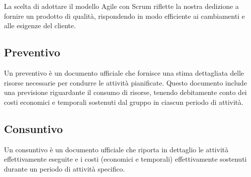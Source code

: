 \documentclass{article}
\begin{document}
La scelta di adottare il modello Agile con Scrum riflette la nostra dedizione a fornire un prodotto di qualità, rispondendo in modo efficiente ai cambiamenti e alle esigenze del cliente.


\subsection{Preventivo}
Un preventivo è un documento ufficiale che fornisce una stima dettagliata delle risorse necessarie per condurre le attività pianificate. Questo documento include una previsione riguardante il consumo di risorse, tenendo debitamente conto dei costi economici e temporali sostenuti dal gruppo in ciascun periodo di attività.
\subsection{Consuntivo}
Un consuntivo è un documento ufficiale che riporta in dettaglio le attività effettivamente eseguite e i costi (economici e temporali) effettivamente sostenuti durante un periodo di attività specifico.
\end{document}
